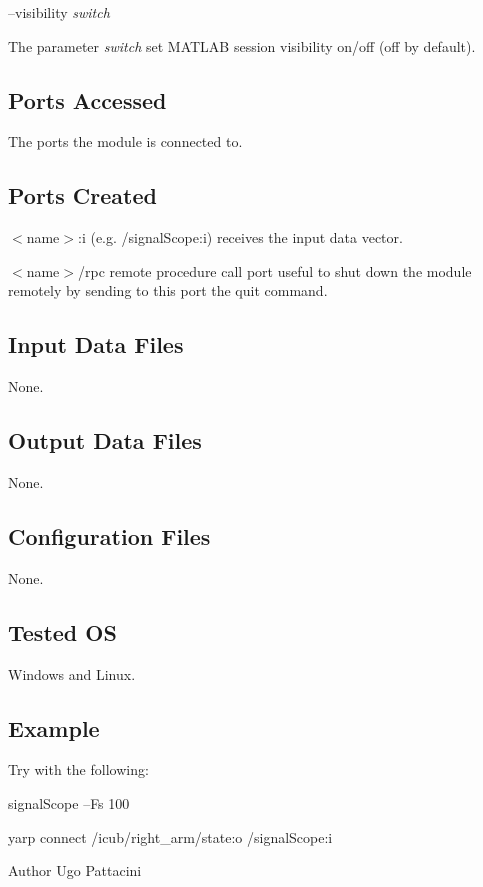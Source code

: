--visibility {\itshape switch} 
\begin{DoxyItemize}
\item The parameter {\itshape switch} set M\+A\+T\+L\+A\+B session visibility on/off (off by default).
\end{DoxyItemize}\hypertarget{group__icub__signalScope_portsa_sec}{}\subsection{Ports Accessed}\label{group__icub__signalScope_portsa_sec}
The ports the module is connected to.\hypertarget{group__icub__tld_portsc_sec}{}\subsection{Ports Created}\label{group__icub__tld_portsc_sec}

\begin{DoxyItemize}
\item {\itshape } $<$name$>$\+:i (e.\+g. /signal\+Scope\+:i) receives the input data vector.
\item {\itshape } $<$name$>$/rpc remote procedure call port useful to shut down the module remotely by sending to this port the \textquotesingle{}quit\textquotesingle{} command.
\end{DoxyItemize}\hypertarget{group__icub__signalScope_in_files_sec}{}\subsection{Input Data Files}\label{group__icub__signalScope_in_files_sec}
None.\hypertarget{group__icub__signalScope_out_data_sec}{}\subsection{Output Data Files}\label{group__icub__signalScope_out_data_sec}
None.\hypertarget{group__icub__signalScope_conf_file_sec}{}\subsection{Configuration Files}\label{group__icub__signalScope_conf_file_sec}
None.\hypertarget{group__icub__tld_tested_os_sec}{}\subsection{Tested O\+S}\label{group__icub__tld_tested_os_sec}
Windows and Linux.\hypertarget{group__icub__signalScope_example_sec}{}\subsection{Example}\label{group__icub__signalScope_example_sec}
Try with the following\+:


\begin{DoxyItemize}
\item signal\+Scope --Fs 100
\item yarp connect /icub/right\+\_\+arm/state\+:o /signal\+Scope\+:i 
\end{DoxyItemize}

\begin{DoxyAuthor}{Author}
Ugo Pattacini 
\end{DoxyAuthor}
